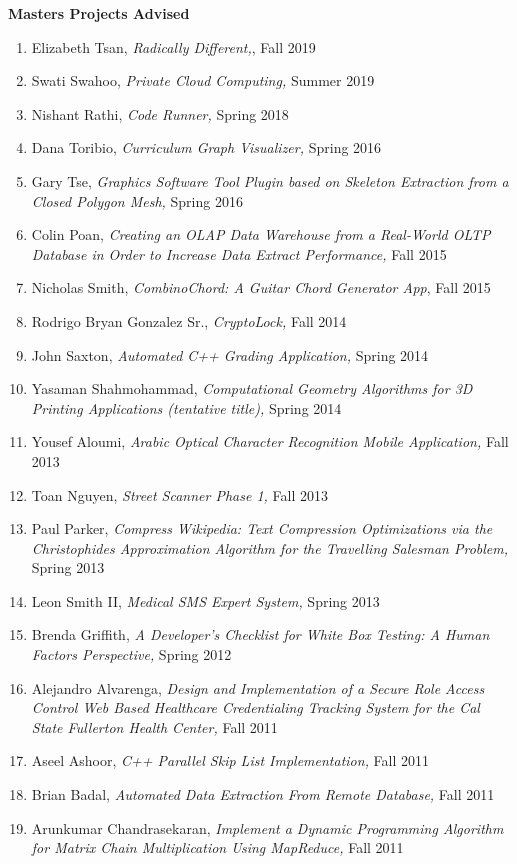 \documentclass[11pt]{letter}
\begin{document}
\textbf{Masters Projects Advised}
\begin{enumerate}
  \item Elizabeth Tsan, \emph{Radically Different,}, Fall 2019
  \item Swati Swahoo, \emph{Private Cloud Computing,} Summer 2019
  \item Nishant Rathi, \emph{Code Runner,} Spring 2018
\item Dana Toribio, \emph{Curriculum Graph Visualizer,} Spring 2016
\item Gary Tse, \emph{Graphics Software Tool Plugin based on Skeleton Extraction from a Closed Polygon Mesh,} Spring 2016
\item Colin Poan, \emph{Creating an OLAP Data Warehouse from a Real-World OLTP Database in Order to Increase Data Extract Performance,} Fall 2015
\item Nicholas Smith, \emph{CombinoChord: A Guitar Chord Generator App}, Fall 2015
\item Rodrigo Bryan Gonzalez Sr., \emph{CryptoLock,} Fall 2014
\item John Saxton, \emph{Automated C++ Grading Application,} Spring 2014
\item Yasaman Shahmohammad, \emph{Computational Geometry Algorithms for 3D Printing Applications (tentative title),} Spring 2014
\item Yousef Aloumi, \emph{Arabic Optical Character Recognition Mobile Application,} Fall 2013
\item Toan Nguyen, \emph{Street Scanner Phase 1,} Fall 2013
\item Paul Parker, \emph{Compress Wikipedia: Text Compression Optimizations via the Christophides Approximation Algorithm for the Travelling Salesman Problem,} Spring 2013
\item Leon Smith II, \emph{Medical SMS Expert System,} Spring 2013
\item Brenda Griffith, \emph{A Developer’s Checklist for White Box Testing: A Human Factors Perspective,} Spring 2012
\item Alejandro Alvarenga, \emph{Design and Implementation of a Secure Role Access Control Web Based Healthcare Credentialing Tracking System for the Cal State Fullerton Health Center,} Fall 2011
\item Aseel Ashoor, \emph{C++ Parallel Skip List Implementation,} Fall 2011
\item Brian Badal, \emph{Automated Data Extraction From Remote Database,} Fall 2011
\item Arunkumar Chandrasekaran, \emph{Implement a Dynamic Programming Algorithm for Matrix Chain Multiplication Using MapReduce,} Fall 2011

\end{enumerate}
\end{document}
